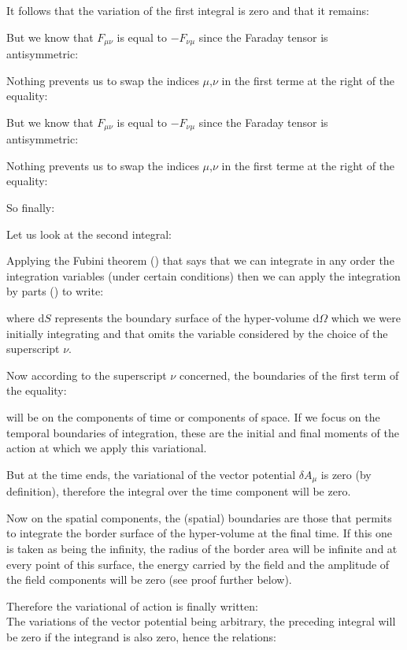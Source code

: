 	It follows that the variation of the first integral is zero and that it remains:
	
	But we know that $F_{\mu\nu}$ is equal to $-F_{\nu\mu}$ since the Faraday tensor is antisymmetric:
	
	Nothing prevents us to swap the indices $\mu$,$\nu$ in the first terme at the right of the equality:
	
	But we know that $F_{\mu\nu}$ is equal to $-F_{\nu\mu}$ since the Faraday tensor is antisymmetric:
	
	Nothing prevents us to swap the indices $\mu$,$\nu$ in the first terme at the right of the equality:
	
	So finally:
	
	Let us look at the second integral:
	
	Applying the Fubini theorem () that says that we can integrate in any order the integration variables (under certain conditions) then we can apply the integration by parts () to write:
	
	where $\mathrm{d}S$ represents the boundary surface of the hyper-volume $\mathrm{d}\Omega$ which we were initially integrating and that omits the variable considered by the choice of the superscript $\nu$.

	Now according to the superscript $\nu$ concerned, the boundaries of the first term of the equality:
	
	will be on the components of time or components of space. If we focus on the temporal boundaries of integration, these are the initial and final moments of the action at which we apply this variational.
	
	But at the time ends, the variational of the vector potential $\delta A_\mu$ is zero (by definition), therefore the integral over the time component will be zero.

	Now on the spatial components, the (spatial) boundaries are those that permits to integrate the border surface of the hyper-volume at the final time. If this one is taken as being the infinity, the radius of the border area will be infinite and at every point of this surface, the energy carried by the field and the amplitude of the field components will be zero (see proof further below).

	Therefore the variational of action is finally written:
	\\
	The variations of the vector potential being arbitrary, the preceding integral will be zero if the integrand is also zero, hence the relations:
	
